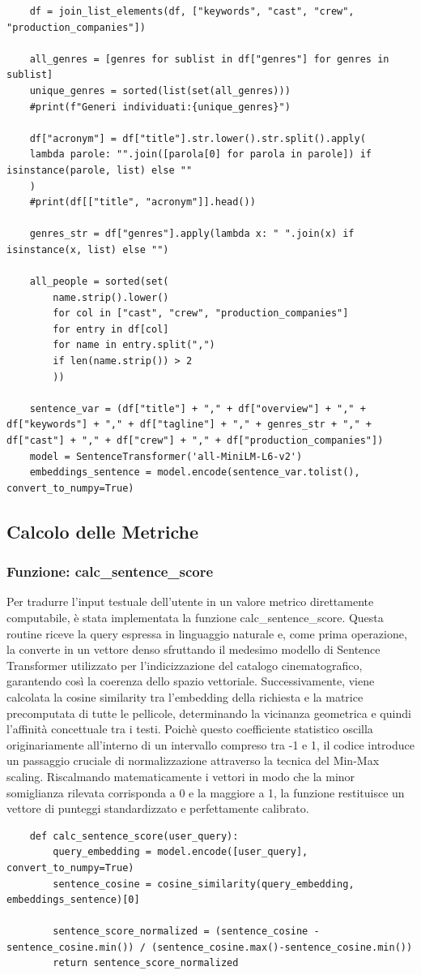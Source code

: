 \documentclass{article}
\begin{document}
\begin{lstlisting}
	df = join_list_elements(df, ["keywords", "cast", "crew", "production_companies"])
	
	all_genres = [genres for sublist in df["genres"] for genres in sublist]
	unique_genres = sorted(list(set(all_genres)))
	#print(f"Generi individuati:{unique_genres}")
	
	df["acronym"] = df["title"].str.lower().str.split().apply(
	lambda parole: "".join([parola[0] for parola in parole]) if isinstance(parole, list) else ""
	)
	#print(df[["title", "acronym"]].head())
	
	genres_str = df["genres"].apply(lambda x: " ".join(x) if isinstance(x, list) else "")
	
	all_people = sorted(set(
		name.strip().lower()
		for col in ["cast", "crew", "production_companies"]
		for entry in df[col]
		for name in entry.split(",")
		if len(name.strip()) > 2
		))
	
	sentence_var = (df["title"] + "," + df["overview"] + "," + df["keywords"] + "," + df["tagline"] + "," + genres_str + "," + df["cast"] + "," + df["crew"] + "," + df["production_companies"]) 
	model = SentenceTransformer('all-MiniLM-L6-v2')
	embeddings_sentence = model.encode(sentence_var.tolist(), convert_to_numpy=True)
\end{lstlisting}
\subsection{Calcolo delle Metriche}
\subsubsection{Funzione: calc\_sentence\_score}
Per tradurre l'input testuale dell'utente in un valore metrico direttamente computabile, \`e stata implementata la funzione calc\_sentence\_score. Questa routine riceve la query espressa in linguaggio naturale e, come prima operazione, la converte in un vettore denso sfruttando il medesimo modello di Sentence Transformer utilizzato per l'indicizzazione del catalogo cinematografico, garantendo cos\`i la coerenza dello spazio vettoriale. Successivamente, viene calcolata la cosine similarity tra l'embedding della richiesta e la matrice precomputata di tutte le pellicole, determinando la vicinanza geometrica e quindi l'affinit\`a concettuale tra i testi. Poich\`e questo coefficiente statistico oscilla originariamente all'interno di un intervallo compreso tra -1 e 1, il codice introduce un passaggio cruciale di normalizzazione attraverso la tecnica del Min-Max scaling. Riscalmando matematicamente i vettori in modo che la minor somiglianza rilevata corrisponda a 0 e la maggiore a 1, la funzione restituisce un vettore di punteggi standardizzato e perfettamente calibrato. 
\begin{lstlisting}
	def calc_sentence_score(user_query):
		query_embedding = model.encode([user_query], convert_to_numpy=True)
		sentence_cosine = cosine_similarity(query_embedding, embeddings_sentence)[0]
	
		sentence_score_normalized = (sentence_cosine - sentence_cosine.min()) / (sentence_cosine.max()-sentence_cosine.min())
		return sentence_score_normalized
\end{lstlisting}
\end{document}
